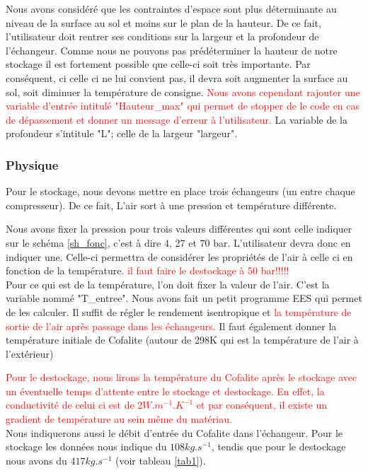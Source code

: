 		Nous avons considéré que les contraintes d'espace sont plus déterminante au niveau de la surface au sol et moins sur le plan de la hauteur. De ce fait, l'utilisateur doit rentrer ses conditions sur la largeur et la profondeur de l'échangeur. Comme nous ne pouvons pas prédéterminer la hauteur de notre stockage il est fortement possible que celle-ci soit très importante. Par conséquent, ci celle ci ne lui convient pas, il devra soit augmenter la surface au sol, soit diminuer la température de consigne.\textcolor{red}{ Nous avons cependant rajouter une variable d'entrée intitulé "Hauteur\_max" qui permet de stopper de le code en cas de dépassement et donner un message d'erreur à l'utilisateur.}
		La variable de la profondeur s'intitule "L"; celle de la largeur "largeur".
		
		
		\subsubsection{Physique}
		
		Pour le stockage, nous devons mettre en place trois échangeurs (un entre chaque compresseur). De ce fait, L'air sort à une pression et température différente. 
		
		Nous avons fixer la pression pour trois valeurs différentes qui sont celle indiquer sur le schéma \ref{sh_fonc}, c'est à dire 4, 27 et 70 bar. L'utilisateur devra donc en indiquer une. Celle-ci permettra de considérer les propriétés de l'air à celle ci en fonction de la température.
		\textcolor{red}{ il faut faire le destockage à 50 bar!!!!!}\\
		
				
		Pour ce qui est de la température, l'on doit fixer la valeur de l'air. C'est la variable nommé "T\_entree". Nous avons fait un petit programme EES qui permet de les calculer. Il suffit de régler le rendement isentropique et \textcolor{red}{la température de sortie de l'air après passage dans les échangeurs.}
		Il faut également donner la température initiale de Cofalite (autour de 298K qui est la température de l'air à l'extérieur)
		
		\textcolor{red}{Pour le destockage, nous lirons la température du Cofalite après le stockage avec un éventuelle temps d'attente entre le stockage et destockage. En effet, la conductivité de celui ci est de $2 W.m^{-1}.K^{-1}$ et par conséquent, il existe un gradient de température au sein même du matériau.}\\
		
		Nous indiquerons aussi le débit d'entrée du Cofalite dans l'échangeur. Pour le stockage les données nous indique du $108kg.s^{-1}$, tendis que pour le destockage nous avons du $417kg.s^{-1}$ (voir tableau \ref{tab1}). 
		
